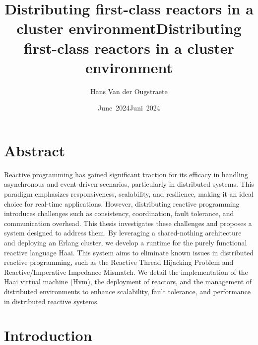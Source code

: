 \documentclass[a4paper]{book}
\title{Distributing first-class reactors in a cluster environment}
\author{Hans Van der Ougstraete}
\date{June~2024}
\begin{document}
\frontmatter
\maketitle%

\title{Distributing first-class reactors in a cluster environment}
%
\date{Juni~2024}%
%
\maketitle%

\chapter{Abstract}
Reactive programming has gained significant traction for its efficacy in handling asynchronous and event-driven scenarios, particularly in distributed systems. This paradigm emphasizes responsiveness, scalability, and resilience, making it an ideal choice for real-time applications. However, distributing reactive programming introduces challenges such as consistency, coordination, fault tolerance, and communication overhead. This thesis investigates these challenges and proposes a system designed to address them. By leveraging a shared-nothing architecture and deploying an Erlang cluster, we develop a runtime for the purely functional reactive language Haai. This system aims to eliminate known issues in distributed reactive programming, such as the Reactive Thread Hijacking Problem and Reactive/Imperative Impedance Mismatch. We detail the implementation of the Haai virtual machine (Hvm), the deployment of reactors, and the management of distributed environments to enhance scalability, fault tolerance, and performance in distributed reactive systems.

\tableofcontents%

\mainmatter%
\chapter{Introduction}
\end{document}
